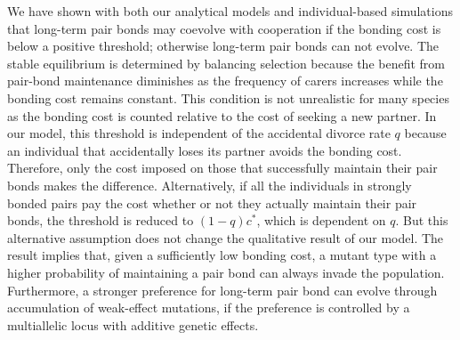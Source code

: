\documentclass[12pt]{article}
\begin{document}
We have shown with both our analytical models and individual-based simulations that long-term pair bonds may coevolve with cooperation if the bonding cost is below a positive threshold; otherwise long-term pair bonds can not evolve. The stable equilibrium is determined by balancing selection because the benefit from pair-bond maintenance diminishes as the frequency of carers increases while the bonding cost remains constant. This condition is not unrealistic for many species as the bonding cost is counted relative to the cost of seeking a new partner. In our model, this threshold is independent of the accidental divorce rate $q$ because an individual that accidentally loses its partner avoids the bonding cost. Therefore, only the cost imposed on those that successfully maintain their pair bonds makes the difference. Alternatively, if all the individuals in strongly bonded pairs pay the cost whether or not they actually maintain their pair bonds, the threshold is reduced to $(1-q) c^*$,  which is dependent on $q$. But this alternative assumption does not change the qualitative result of our model. The result implies that, given a sufficiently low bonding cost, a mutant type with a higher probability of maintaining a pair bond can always invade the population. Furthermore, a stronger preference for long-term pair bond can evolve through accumulation of weak-effect mutations, if the preference is controlled by a multiallelic locus with additive genetic effects. 
\end{document}
